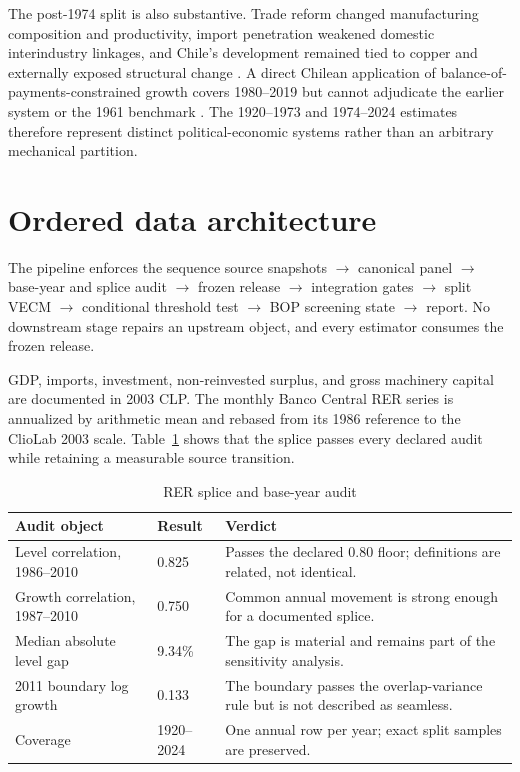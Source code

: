 \documentclass[11pt]{article}
\begin{document}
The post-1974 split is also substantive. Trade reform changed manufacturing composition and productivity, import penetration weakened domestic interindustry linkages, and Chile's development remained tied to copper and externally exposed structural change \citep{ffd1983a,ffd1983b,ffd2002,albala2006,palma2019,solimano2024}. A direct Chilean application of balance-of-payments-constrained growth covers 1980--2019 but cannot adjudicate the earlier system or the 1961 benchmark \citep{yunga2022}. The 1920--1973 and 1974--2024 estimates therefore represent distinct political-economic systems rather than an arbitrary mechanical partition.

\FloatBarrier
\section{Ordered data architecture}

The pipeline enforces the sequence source snapshots $\rightarrow$ canonical panel $\rightarrow$ base-year and splice audit $\rightarrow$ frozen release $\rightarrow$ integration gates $\rightarrow$ split VECM $\rightarrow$ conditional threshold test $\rightarrow$ BOP screening state $\rightarrow$ report. No downstream stage repairs an upstream object, and every estimator consumes the frozen release.

GDP, imports, investment, non-reinvested surplus, and gross machinery capital are documented in 2003 CLP. The monthly Banco Central RER series is annualized by arithmetic mean and rebased from its 1986 reference to the ClioLab 2003 scale. Table~\ref{tab:rer} shows that the splice passes every declared audit while retaining a measurable source transition.

\begin{table}[H]
\centering
\caption{RER splice and base-year audit}
\label{tab:rer}
\begin{tabular}{p{5.7cm}p{2.2cm}p{6.1cm}}
\toprule
\textbf{Audit object} & \textbf{Result} & \textbf{Verdict} \\
\midrule
Level correlation, 1986--2010 & 0.825 & Passes the declared 0.80 floor; definitions are related, not identical. \\
Growth correlation, 1987--2010 & 0.750 & Common annual movement is strong enough for a documented splice. \\
Median absolute level gap & 9.34\% & The gap is material and remains part of the sensitivity analysis. \\
2011 boundary log growth & 0.133 & The boundary passes the overlap-variance rule but is not described as seamless. \\
Coverage & 1920--2024 & One annual row per year; exact split samples are preserved. \\
\bottomrule
\end{tabular}
\end{table}
\end{document}
